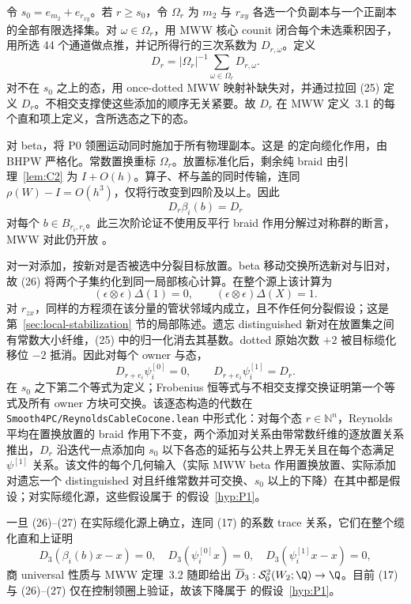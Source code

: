 令 $s_0=e_{m_2}+e_{r_{xy}}$。若 $r\ge s_0$，令 $\Omega_r$ 为 $m_2$ 与 $r_{xy}$ 各选一个负副本与一个正副本的全部有限选择集。对 $\omega\in\Omega_r$，用 MWW 核心 counit 闭合每个未选乘积因子，用所选 44 个通道做点推，并记所得行的三次系数为 $D_{r,\omega}$。定义
\[
D_r=|\Omega_r|^{-1}\sum_{\omega\in\Omega_r}D_{r,\omega}.
\tag{25}
\]
对不在 $s_0$ 之上的态，用 once-dotted MWW 映射补缺失对，并通过拉回 (25) 定义 $D_r$。不相交支撑使这些添加的顺序无关紧要。故 $D_r$ 在 MWW 定义~3.1 的每个直和项上定义，含所选态之下的态。

对 beta，将 P0 领圈运动同时施加于所有物理副本。这是 \cite[Theorem~E]{BeliakovaPutyraWehrli2019} 的定向缆化作用，由 BHPW 严格化。常数置换重标 $\Omega_r$。放置标准化后，剩余纯 braid 由引理~\ref{lem:C2} 为 \(I+O(h)\)。算子、杯与盖的同时传输，连同 $\rho(W)-I=O(h^3)$，仅将行改变到四阶及以上。因此
\[
D_r\beta_i(b)=D_r
\tag{26}
\]
对每个 $b\in B_{r_i,r_i}$。此三次阶论证不使用反平行 braid 作用分解过对称群的断言，MWW 对此仍开放
\cite[Remark~3.3]{ManolescuWalkerWedrich2023}。

对一对添加，按新对是否被选中分裂目标放置。beta 移动交换所选新对与旧对，故 (26) 将两个子集约化到同一局部核心计算。在整个源上该计算为
\[
(\epsilon\otimes\epsilon)\Delta(1)=0,\qquad
(\epsilon\otimes\epsilon)\Delta(X)=1.
\]
对 $r_{zx}$，同样的方程须在该分量的管状邻域内成立，且不作任何分裂假设；这是第~\ref{sec:local-stabilization} 节的局部陈述。遗忘 distinguished 新对在放置集之间有常数大小纤维，(25) 中的归一化消去其基数。dotted 原始次数 $+2$ 被目标缆化移位 $-2$ 抵消。因此对每个 owner 与态，
\[
D_{r+e_i}\psi_i^{[0]}=0,\qquad
D_{r+e_i}\psi_i^{[1]}=D_r.
\tag{27}
\]
在 $s_0$ 之下第二个等式为定义；Frobenius 恒等式与不相交支撑交换证明第一个等式及所有 owner 方块可交换。该逐态构造的代数在 \texttt{Smooth4PC/ReynoldsCableCocone.lean} 中形式化：对每个态 $r\in\mathbb N^n$，Reynolds 平均在置换放置的 braid 作用下不变，两个添加对关系由带常数纤维的逐放置关系推出，$D_r$ 沿迭代一点添加向 $s_0$ 以下各态的延拓与公共上界无关且在每个态满足 $\psi^{[1]}$ 关系。该文件的每个几何输入（实际 MWW beta 作用置换放置、实际添加对遗忘一个 distinguished 对且纤维常数并可交换、$s_0$ 以上的下降）在其中都是假设；对实际缆化源，这些假设属于 \Open 的假设~\ref{hyp:P1}。

一旦 (26)--(27) 在实际缆化源上确立，连同 (17) 的系数 trace 关系，它们在整个缆化直和上证明
\[
D_3(\beta_i(b)x-x)=0,\quad
D_3(\psi_i^{[0]}x)=0,\quad
D_3(\psi_i^{[1]}x-x)=0,
\]
商 universal 性质与 MWW 定理~3.2 随即给出 $\overline D_3:\mathcal S^2_0(W_2;\Q)\to\Q$。目前 (17) 与 (26)--(27) 仅在控制领圈上验证，故该下降属于 \Open 的假设~\ref{hyp:P1}。

